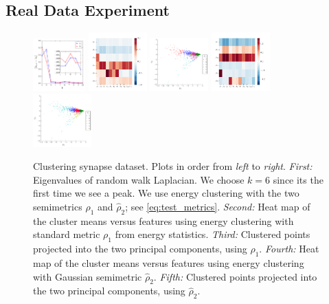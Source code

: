 \documentclass{article}
\begin{document}
\subsection{Real Data Experiment}


\begin{figure}
\includegraphics[width=0.18\textwidth]{eigen_gap.pdf}
\includegraphics[width=0.2\textwidth]{heat_means_k6_energy.pdf}
\includegraphics[width=0.2\textwidth]{synapse_cluster_2d_k6_energy.pdf}
\includegraphics[width=0.2\textwidth]{heat_means_k6_gauss.pdf}
\includegraphics[width=0.2\textwidth]{synapse_cluster_2d_k6_gauss.pdf}
\vspace{-0.8cm}
\caption{\label{fig:synapse}
Clustering synapse dataset.
Plots in order from \emph{left} to \emph{right}.
\emph{First:} Eigenvalues of random walk Laplacian. We choose
$k=6$ since its the first time we see a peak. We use energy clustering
with the two semimetrics $\rho_1$ and $\widehat{\rho}_2$; see
\eqref{eq:test_metrics}.
\emph{Second:} Heat map of the cluster means versus features
using energy clustering with standard
metric $\rho_1$ from energy statistics.
\emph{Third:} Clustered points projected into the two principal components,
using $\rho_1$.
\emph{Fourth:} Heat map of the cluster means versus features
using energy clustering with Gaussian semimetric 
$\widehat{\rho}_2$.
\emph{Fifth:} Clustered points projected into the two principal components,
using $\widehat{\rho}_2$.
}
\end{figure}
\end{document}
